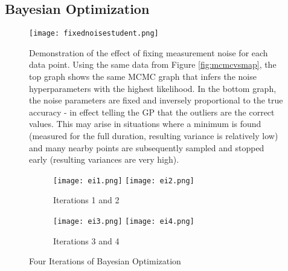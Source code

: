 \begin{appendices}

\chapter{Bayesian Optimization}
\begin{figure}[h]
\texttt{[image: fixednoisestudent.png]}
\caption{Demonstration of the effect of fixing measurement noise for each data point. Using the same data from Figure \ref{fig:mcmcvsmap}, the top graph shows the same MCMC graph that infers the noise hyperparameters with the highest likelihood. In the bottom graph, the noise parameters are fixed and inversely proportional to the true accuracy - in effect telling the GP that the outliers are the correct values. This may arise in situations where a minimum is found (measured for the full duration, resulting variance is relatively low) and many nearby points are subsequently sampled and stopped early (resulting variances are very high).}
\label{fig:fixednoise}
\end{figure}

\begin{sidewaysfigure}[h]
\begin{subfigure}{\textwidth}
\texttt{[image: ei1.png]}\hfill
\texttt{[image: ei2.png]}
\caption{Iterations 1 and 2}
\end{subfigure}
\par\medskip
\begin{subfigure}{\textwidth}
\texttt{[image: ei3.png]}\hfill
\texttt{[image: ei4.png]}
\caption{Iterations 3 and 4}
\end{subfigure}
\caption{Four Iterations of Bayesian Optimization}
\label{fig:ei}
\end{sidewaysfigure}


\end{appendices}
